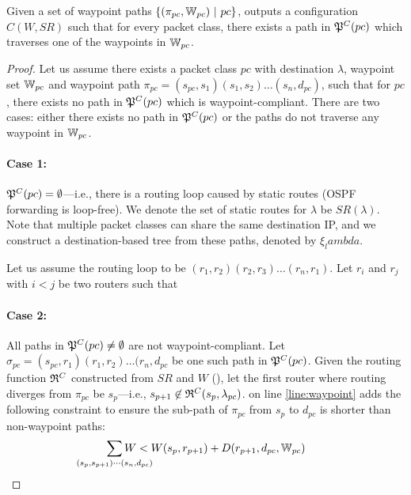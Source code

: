 \begin{theorem}[Soundness]
	Given a set of waypoint paths $\{(\pi_{pc}, \mathbb{W}_{pc}) ~|~ pc\}$,
	 outputs a configuration $C(W,SR)$ 
	such that for every packet class, 
	there exists a path in $\mathfrak{P}^C(pc)$ which
	traverses one of the waypoints in $\mathbb{W}_{pc}$.
\end{theorem}
\begin{proof}
	Let us assume there exists a packet class $pc$ 
	with destination $\lambda$, 
	waypoint set $\mathbb{W}_{pc}$ 
	and waypoint path $\pi_{pc} = (s_{pc}, s_1)(s_1, s_2)\ldots (s_n, d_{pc})$, 
	such that for $pc$, 
	there exists no path in $\mathfrak{P}^C(pc)$
	which is waypoint-compliant. There are two
	cases: either there exists no path in $\mathfrak{P}^C(pc)$ 
	or the paths do not traverse any waypoint in $\mathbb{W}_{pc}$.

	\paragraph{Case 1:} $\mathfrak{P}^C(pc) = \emptyset$---i.e., there
	is a routing loop caused by static routes (OSPF forwarding
	is loop-free).
	We denote the set of static routes for $\lambda$ be $SR(\lambda)$. Note that
	multiple packet classes can share the same destination IP, and we 
	construct a destination-based tree from these paths, denoted by 
	$\xi_lambda$. 

	Let us assume the routing loop to be 
	$(r_1, r_2) (r_2, r_3) \ldots (r_n, r_1)$.
	Let $r_i$ and $r_j$ with $i < j$ be two routers
	such that 


	\paragraph{Case 2:} All paths in $\mathfrak{P}^C(pc)
	\not=\emptyset$ are not waypoint-compliant. 
	Let $\sigma_{pc} = (s_{pc}, r_1)(r_1, r_2) \ldots
	(r_n, d_{pc}$ be one such path in $\mathfrak{P}^C(pc)$.
	Given the routing function $\mathfrak{R}^C$ constructed from $SR$ and
	$W$ (), let the first router where routing diverges from $\pi_{pc}$ be $s_p$---i.e.,  
	$s_{p+1} \not\in \mathfrak{R}^C(s_{p}, \lambda_{pc})$. 
	 on line \ref{line:waypoint} adds the following
	constraint to ensure the sub-path of $\pi_{pc}$ 
	from $s_{p}$ to $d_{pc}$ is shorter than non-waypoint paths:
	\begin{equation} \label{eq:wuniq}
	\sum_{\mathclap{\substack{(s_{p}, s_{p+1})\cdots(s_n, d_{pc})}}} 
	W < W(s_{p}, r_{p+1})+ D(r_{p+1}, d_{pc}, \waypt_{pc})
	\end{equation}


\end{proof}
